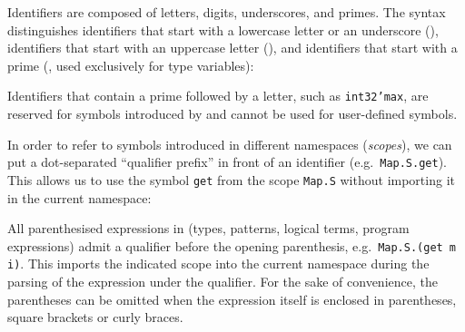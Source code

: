 Identifiers are composed of letters, digits, underscores,
and primes. %
The syntax distinguishes identifiers that start with a lowercase letter
or an underscore (\spacefalse), identifiers that
start with an uppercase letter (\spacefalse),
and identifiers that start with a prime
(\spacefalse, used exclusively for type variables):
\begin{center}\end{center}
Identifiers that contain a prime followed by a letter,
such as \texttt{int32'max}, are reserved for symbols
introduced by \why and cannot be used for user-defined symbols.

In order to refer to symbols introduced in different namespaces
(\textit{scopes}), we can put a dot-separated ``qualifier prefix''
in front of an identifier (e.g.~\texttt{Map.S.get}).
This allows us to use the symbol \texttt{get}
from the scope \texttt{Map.S} without importing
it in the current namespace:
\begin{center}\end{center}
All parenthesised expressions in \whyml (types,
patterns, logical terms, program expressions)
admit a qualifier before the opening parenthesis,
e.g.~\texttt{Map.S.(get m i)}. This imports
the indicated scope into the current namespace during
the parsing of the expression under the qualifier.
For the sake of convenience, the parentheses can be omitted
when the expression itself is enclosed in parentheses,
square brackets or curly braces.

